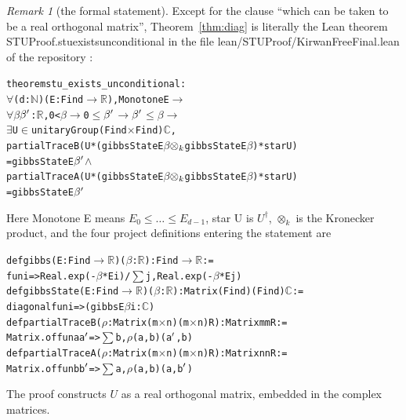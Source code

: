 \documentclass[11pt]{amsart}
\theoremstyle{definition}
\theoremstyle{remark}
\newtheorem{remark}[lemma]{Remark}
\numberwithin{equation}{section}
\newcommand{\leanus}{\textunderscore\allowbreak}
\newcommand{\lean}[1]{{\ttfamily\let\_\leanus #1}}
\begin{document}
\begin{remark}[the formal statement]\label{rem:leanstatement}
Except for the clause ``which can be taken to be a real orthogonal matrix'', Theorem~\ref{thm:diag}
is literally the Lean theorem \lean{STUProof.stu\_exists\_unconditional} in the file
\lean{lean/STUProof/KirwanFreeFinal.lean} of the repository \cite{STUrepo}:
\begin{alltt}\small
theorem stu_exists_unconditional :
    \(\forall\) (d : \(\mathbb{N}\)) (E : Fin d \(\to\) \(\mathbb{R}\)), Monotone E \(\to\)
    \(\forall\) \(\beta\) \(\beta\sp{\prime}\) : \(\mathbb{R}\), 0 < \(\beta\) \(\to\) 0 \(\le\) \(\beta\sp{\prime}\) \(\to\) \(\beta\sp{\prime}\) \(\le\) \(\beta\) \(\to\)
      \(\exists\) U \(\in\) unitaryGroup (Fin d \(\times\) Fin d) \(\mathbb{C}\),
        partialTraceB (U * (gibbsState E \(\beta\) \(\otimes\sb{k}\) gibbsState E \(\beta\)) * star U)
            = gibbsState E \(\beta\sp{\prime}\) \(\wedge\)
        partialTraceA (U * (gibbsState E \(\beta\) \(\otimes\sb{k}\) gibbsState E \(\beta\)) * star U)
            = gibbsState E \(\beta\sp{\prime}\)
\end{alltt}
Here \lean{Monotone E} means $E_0\le\dots\le E_{d-1}$, \lean{star U} is $U^\dagger$,
$\otimes_k$ is the Kronecker product, and the four project definitions entering the statement are
\begin{alltt}\small
def gibbs (E : Fin d \(\to\) \(\mathbb{R}\)) (\(\beta\) : \(\mathbb{R}\)) : Fin d \(\to\) \(\mathbb{R}\) :=
  fun i => Real.exp (-\(\beta\) * E i) / \(\sum\) j, Real.exp (-\(\beta\) * E j)
def gibbsState (E : Fin d \(\to\) \(\mathbb{R}\)) (\(\beta\) : \(\mathbb{R}\)) : Matrix (Fin d) (Fin d) \(\mathbb{C}\) :=
  diagonal fun i => (gibbs E \(\beta\) i : \(\mathbb{C}\))
def partialTraceB (\(\rho\) : Matrix (m \(\times\) n) (m \(\times\) n) R) : Matrix m m R :=
  Matrix.of fun a a\(\sp{\prime}\) => \(\sum\) b, \(\rho\) (a, b) (a\(\sp{\prime}\), b)
def partialTraceA (\(\rho\) : Matrix (m \(\times\) n) (m \(\times\) n) R) : Matrix n n R :=
  Matrix.of fun b b\(\sp{\prime}\) => \(\sum\) a, \(\rho\) (a, b) (a, b\(\sp{\prime}\))
\end{alltt}
The proof constructs $U$ as a real orthogonal matrix, embedded in the complex matrices.
\end{remark}
\end{document}
